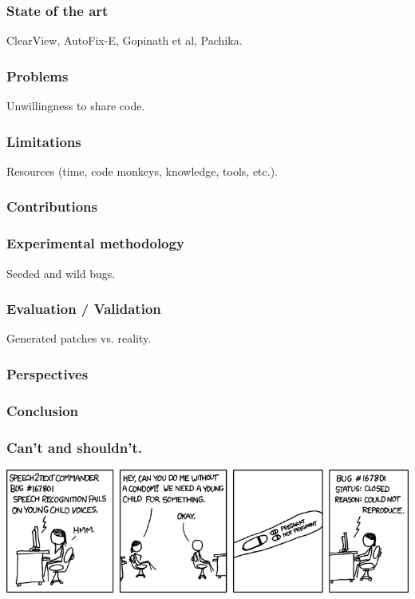 \documentclass{beamer}
\begin{document}
  \frame
  {
    \frametitle{State of the art}
    ClearView, AutoFix-E, Gopinath et al, Pachika.
  }

  \frame
  {
    \frametitle{Problems}
    Unwillingness to share code.
  }
  
  \frame
  {
    \frametitle{Limitations}
    Resources (time, code monkeys, knowledge, tools, etc.).
  }

  \frame
  {
    \frametitle{Contributions}
  }


  \frame
  {
    \frametitle{Experimental methodology}
    Seeded and wild bugs.
  }
  
  \frame
  {
    \frametitle{Evaluation / Validation}
    Generated patches vs. reality.
  }
  
  \frame
  {
    \frametitle{Perspectives}
    
  }
  
  \frame
  {
    \frametitle{Conclusion}
    
  }
  
 \frame
  {
    \frametitle{Can't and shouldn't.}
\includegraphics[width=.85\paperwidth]{cnr}


}
\end{document}
